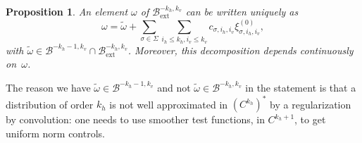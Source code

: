 \documentclass[JEP,XML,SOM,Unicode]{cedram}
\newcommand{\ext}{\mathrm{ext}}
\newcommand{\boB}{\mathcal{B}}
\newtheorem{prop}[thm]{Proposition}
\theoremstyle{definition}
\numberwithin{equation}{section}
\begin{document}
\begin{prop}
\label{prop:finite_codim} An element $\omega$ of $\boB_{\ext}^{-k_h, k_v}$ can
be written uniquely as
\begin{equation}
\label{eq:dec_omega}
\omega = \tilde \omega + \sum_{\sigma \in \Sigma} \sum_{i_h \leq k_h, i_v\leq
k_v} c_{\sigma, i_h, i_v} \xi^{(0)}_{\sigma, i_h, i_v},
\end{equation}
with $\tilde\omega\!\in\!\boB^{-k_h-1, k_v} \cap \boB_{\ext}^{-k_h, k_v}$.
Moreover, this decomposition depends continuously on~$\omega$.
\end{prop}
The reason we have $\tilde\omega \in\boB^{-k_h-1, k_v}$ and not $\tilde\omega
\in\boB^{-k_h, k_v}$ in the statement is that a distribution of order $k_h$
is not well approximated in $(C^{k_h})^*$ by a regularization by convolution:
one needs to use smoother test functions, in $C^{k_h+1}$, to get uniform norm
controls.
\end{document}
